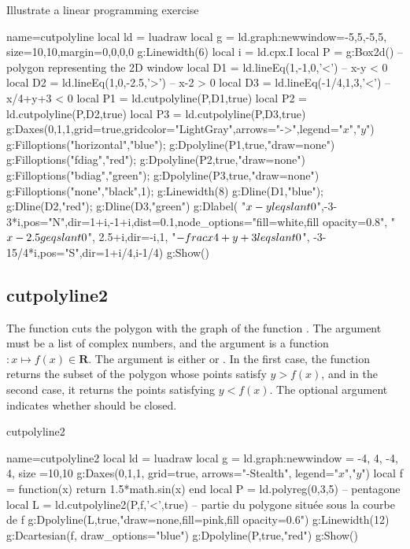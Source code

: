 \begin{demo}{Illustrate a linear programming exercise}
\begin{luadraw}{name=cutpolyline}
local ld = luadraw
local g = ld.graph:new{window={-5,5,-5,5}, size={10,10},margin={0,0,0,0}}
g:Linewidth(6)
local i = ld.cpx.I
local P = g:Box2d() -- polygon representing the 2D window
local D1 = ld.lineEq(1,-1,0,'<')    -- x-y < 0
local D2 = ld.lineEq(1,0,-2.5,'>')  -- x-2 > 0
local D3 = ld.lineEq(-1/4,1,3,'<')  -- x/4+y+3 < 0
local P1 = ld.cutpolyline(P,D1,true)
local P2 = ld.cutpolyline(P,D2,true)
local P3 = ld.cutpolyline(P,D3,true)
g:Daxes({0,1,1},{grid=true,gridcolor="LightGray",arrows="->",legend={"$x$","$y$"}})
g:Filloptions("horizontal","blue"); g:Dpolyline(P1,true,"draw=none")
g:Filloptions("fdiag","red"); g:Dpolyline(P2,true,"draw=none")
g:Filloptions("bdiag","green"); g:Dpolyline(P3,true,"draw=none")
g:Filloptions("none","black",1); g:Linewidth(8)
g:Dline(D1,"blue"); g:Dline(D2,"red"); g:Dline(D3,"green")
g:Dlabel(
  "$x-y\\leqslant 0$",-3-3*i,{pos="N",dir={1+i,-1+i},dist=0.1,node_options="fill=white,fill opacity=0.8"},
  "$x-2.5\\geqslant0$", 2.5+i,{dir={-i,1}},
  "$-\\frac{x}{4}+y+3\\leqslant0$", -3-15/4*i,{pos="S",dir={1+i/4,i-1/4}})
g:Show()
\end{luadraw}
\end{demo}

\subsection{cutpolyline2}

The function  cuts the polygon  with the graph of the function . The argument  must be a list of complex numbers, and the argument  is a function $\colon x \mapsto f(x)\in \mathbf R$. The argument  is either  or . In the first case, the function returns the subset of the polygon  whose points satisfy $y>f(x)$, and in the second case, it returns the points satisfying $y<f(x)$. The optional argument  indicates whether  should be closed.

\begin{demo}{cutpolyline2}
\begin{luadraw}{name=cutpolyline2}
local ld = luadraw
local g = ld.graph:new{window = {-4, 4, -4, 4}, size ={10,10}}
g:Daxes({0,1,1}, {grid=true, arrows="-Stealth", legend={"$x$","$y$"}})
local f = function(x) return 1.5*math.sin(x) end
local P = ld.polyreg(0,3,5) -- pentagone
local L = ld.cutpolyline2(P,f,'<',true) -- partie du polygone située sous la courbe de f
g:Dpolyline(L,true,"draw=none,fill=pink,fill opacity=0.6")
g:Linewidth(12)
g:Dcartesian(f, {draw_options="blue"})
g:Dpolyline(P,true,"red")
g:Show()
\end{luadraw}
\end{demo}

